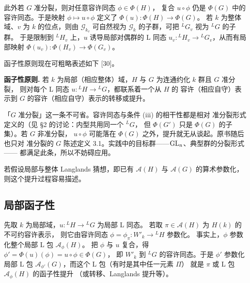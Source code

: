 此外若 $G$ 准分裂，则对任意容许同态 $\phi\in\Phi(H)$，
复合 $u\circ\phi$ 仍是 $\Phi(G)$ 中的容许同态。于是映射
$\phi\mapsto u\circ\phi$ 定义了 $\Phi(u)\colon\Phi(H)\to\Phi(G)$。
若 $k$ 为整体域、$v$ 为 $k$ 的位点，则由 $\mathcal{G}_{k_v}$ 可自然视为
$\mathcal{G}_k$ 的子群，可把 ${}^{L}G_v$ 视为 ${}^{L}G$ 的子群。
于是限制到 ${}^{L}H_v$ 上，$u$ 诱导局部对偶群的 L 同态
$u_v\colon{}^{L}H_v\to{}^{L}G_v$，从而有局部映射
$\Phi(u_v)\colon\Phi(H_v)\to\Phi(G_v)$。

函子性原则现在可粗略表述如下 [30]。

\par\medskip\noindent\textbf{函子性原则.}\quad
若 $k$ 为局部（相应整体）域，$H$ 与 $G$ 为连通约化 $k$ 群且 $G$ 准分裂，
则对每个 L 同态 $u\colon{}^{L}H\to{}^{L}G$，都联系着一个从 $H$ 的
容许（相应自守）表示到 $G$ 的容许（相应自守）表示的转移或提升。
\begin{annote}
「$G$ 准分裂」这一条不可省。容许同态与条件 (iii) 的相干性都是相对
准分裂形式定义的（见 \S2 的讨论：内型共用同一个 ${}^{L}G$，
但 $\Phi(G')$ 只是 $\Phi(G)$ 的子集）。若 $G$ 非准分裂，
$u\circ\phi$ 可能落在 $\Phi(G)$ 之外，提升就无从谈起。原书随后也只对
准分裂的 $G$ 陈述定义 3.1。实践中的目标群——$\mathrm{GL}_n$、典型群的分裂形式——
都满足此条，所以不妨碍应用。
\par{}
\end{annote}

若假设局部与整体 Langlands 猜想，即已有 $\mathcal{A}(H)$ 与 $\mathcal{A}(G)$
的算术参数化，则这个提升过程容易描述。

\subsection{局部函子性}

先取 $k$ 为局部域，$u\colon{}^{L}H\to{}^{L}G$ 为局部 L 同态。
若取 $\pi\in\mathcal{A}(H)$ 为 $H(k)$ 的不可约容许表示，
则它由容许同态 $\phi=\phi_\pi\colon W'_k\to{}^{L}H$ 参数化。
事实上，$\phi$ 参数化整个局部 L 包 $\mathcal{A}_\phi(H)$。
把 $\phi$ 与 $u$ 复合，得 $\phi'=\Phi(u)(\phi)=u\circ\phi\in\Phi(G)$，
即 $W'_k$ 到 ${}^{L}G$ 的容许同态。于是 $\phi'$ 参数化局部 L 包
$\mathcal{A}_{\phi'}(G)$，而这个 L 包（有时是其中任一元素 $\Pi$）
就是 $\pi$ 或 L 包 $\mathcal{A}_\phi(H)$ 的函子性提升
（或转移、Langlands 提升等）。

